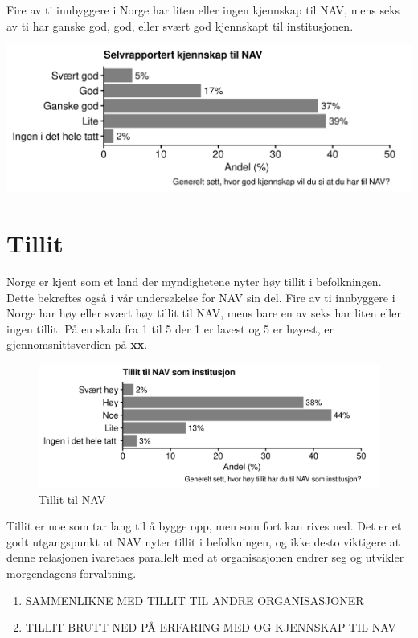 \documentclass[
]{book}
\providecommand{\tightlist}{%
  \setlength{\itemsep}{0pt}\setlength{\parskip}{0pt}}
\begin{document}
Fire av ti innbyggere i Norge har liten eller ingen kjennskap til NAV, mens seks av ti har ganske god, god, eller svært god kjennskapt til institusjonen.

\includegraphics{figs/png/fig_nav_knowledge.png}

\hypertarget{tillit}{%
\section{Tillit}\label{tillit}}

Norge er kjent som et land der myndighetene nyter høy tillit i befolkningen.
Dette bekreftes også i vår undersøkelse for NAV sin del.
Fire av ti innbyggere i Norge har høy eller svært høy tillit til NAV, mens bare en av seks har liten eller ingen tillit.
På en skala fra 1 til 5 der 1 er lavest og 5 er høyest, er gjennomsnittsverdien på \textbf{xx}.

\begin{figure}
\centering
\includegraphics{figs/png/fig_nav_trust.png}
\caption{Tillit til NAV}
\end{figure}

Tillit er noe som tar lang til å bygge opp, men som fort kan rives ned.
Det er et godt utgangspunkt at NAV nyter tillit i befolkningen, og ikke desto viktigere at denne relasjonen ivaretaes parallelt med at organisasjonen endrer seg og utvikler morgendagens forvaltning.

\begin{enumerate}
\def\labelenumi{\arabic{enumi}.}
\tightlist
\item
  SAMMENLIKNE MED TILLIT TIL ANDRE ORGANISASJONER
\item
  TILLIT BRUTT NED PÅ ERFARING MED OG KJENNSKAP TIL NAV
\end{enumerate}
\end{document}
